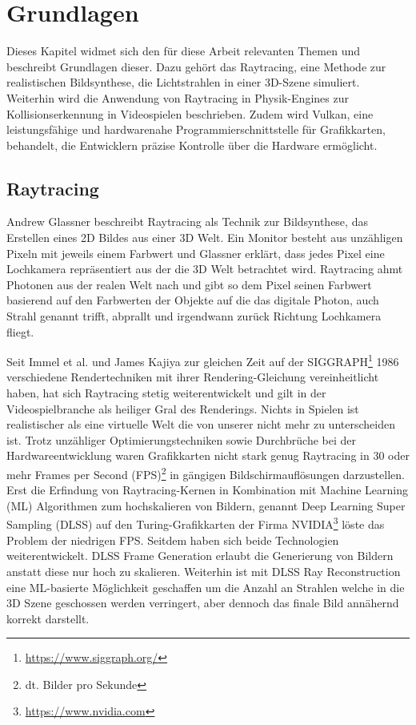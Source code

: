 \documentclass[11pt]{scrartcl}
\begin{document}
	\pagebreak
	\section{Grundlagen}
	
	Dieses Kapitel widmet sich den für diese Arbeit relevanten Themen und beschreibt Grundlagen dieser. Dazu gehört das Raytracing, eine Methode zur realistischen Bildsynthese, die Lichtstrahlen in einer 3D-Szene simuliert. Weiterhin wird die Anwendung von Raytracing in Physik-Engines zur Kollisionserkennung in Videospielen beschrieben. Zudem wird Vulkan, eine leistungsfähige und hardwarenahe Programmierschnittstelle für Grafikkarten, behandelt, die Entwicklern präzise Kontrolle über die Hardware ermöglicht.
	
	\subsection{Raytracing}
	
	Andrew Glassner beschreibt Raytracing als Technik zur Bildsynthese, das Erstellen eines 2D Bildes aus einer 3D Welt\cite{Glassner2019}. Ein Monitor besteht aus unzähligen Pixeln mit jeweils einem Farbwert und Glassner erklärt, dass jedes Pixel eine Lochkamera repräsentiert aus der die 3D Welt betrachtet wird. Raytracing ahmt Photonen aus der realen Welt nach und gibt so dem Pixel seinen Farbwert basierend auf den Farbwerten der Objekte auf die das digitale Photon, auch Strahl genannt trifft, abprallt und irgendwann zurück Richtung Lochkamera fliegt.
	
	Seit Immel et al. und James Kajiya zur gleichen Zeit auf der SIGGRAPH\footnote{\url{https://www.siggraph.org/}} 1986 verschiedene Rendertechniken mit ihrer Rendering-Gleichung vereinheitlicht haben\cite{ImmelEtAl1986, Kajiya1986}, hat sich Raytracing stetig weiterentwickelt und gilt in der Videospielbranche als heiliger Gral des Renderings\cite{Corporation2018}. Nichts in Spielen ist realistischer als eine virtuelle Welt die von unserer nicht mehr zu unterscheiden ist. Trotz unzähliger Optimierungstechniken sowie Durchbrüche bei der Hardwareentwicklung waren Grafikkarten nicht stark genug Raytracing in 30 oder mehr Frames per Second (FPS)\footnote{dt. Bilder pro Sekunde} in gängigen Bildschirmauflösungen darzustellen. Erst die Erfindung von Raytracing-Kernen in Kombination mit Machine Learning (ML) Algorithmen zum hochskalieren von Bildern, genannt Deep Learning Super Sampling (DLSS)\cite{NvidiaDlss2024} auf den Turing-Grafikkarten der Firma NVIDIA\footnote{\url{https://www.nvidia.com}} löste das Problem der niedrigen FPS\cite{Corporation2018}. Seitdem haben sich beide Technologien weiterentwickelt. DLSS Frame Generation\cite{NvidiaDlss2024} erlaubt die Generierung von Bildern anstatt diese nur hoch zu skalieren. Weiterhin ist mit DLSS Ray Reconstruction\cite{NvidiaDlss2024} eine ML-basierte Möglichkeit geschaffen um die Anzahl an Strahlen welche in die 3D Szene geschossen werden verringert, aber dennoch das finale Bild annähernd korrekt darstellt.
	
\end{document}
